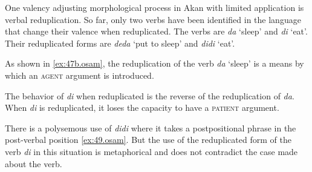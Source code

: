 \documentclass[output=paper]{langsci/langscibook}
\begin{document}
One valency adjusting morphological process in Akan with limited application is verbal reduplication. So far, only two verbs have been identified in the language that change their valence when reduplicated. The verbs are \textit{da} `sleep' and \textit{di} `eat'. Their reduplicated forms are \textit{deda} `put to sleep' and \textit{didi} `eat'.

\ea
\label{ex:47.osam}
	\z

	\z
\z

As shown in \ref{ex:47b.osam}, the reduplication of the verb \textit{da} `sleep' is a means by which an \textsc{agent} argument is introduced.

The behavior of \textit{di} when reduplicated is the reverse of the reduplication of \textit{da}. When \textit{di} is reduplicated, it loses the capacity to have a \textsc{patient} argument.

\ea
\label{ex:48.osam}
	\z

	\z

	\z
\z

There is a polysemous use of \textit{didi} where it takes a postpositional phrase in the post-verbal position \ref{ex:49.osam}. But the use of the reduplicated form of the verb \textit{di} in this situation is metaphorical and does not contradict the case made about the verb.
\end{document}
